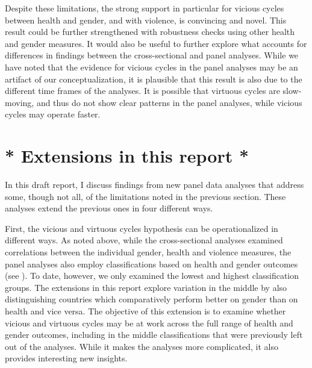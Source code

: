 \documentclass[12pt]{article}
\begin{document}
Despite these limitations, the strong support in particular for vicious cycles between health and gender, and with violence, is convincing and novel.
This result could be further strengthened with robustness checks using other health and gender measures.
It would also be useful to further explore what accounts for differences in findings between the cross-sectional and panel analyses.
While we have noted that the evidence for vicious cycles in the panel analyses may be an artifact of our conceptualization, it is plausible that this result is also due to the different time frames of the analyses. It is possible that virtuous cycles are slow-moving, and thus do not show clear patterns in the panel analyses, while vicious cycles may operate faster.

\section{* Extensions in this report *}
\label{extensions}

In this draft report, I discuss findings from new panel data analyses that address some, though not all, of the limitations noted in the previous section. These analyses extend the previous ones in four different ways.

First, the vicious and virtuous cycles hypothesis can be operationalized in different ways. As noted above, while the cross-sectional analyses examined correlations between the individual gender, health and violence measures, the panel analyses also employ classifications based on health and gender outcomes (see ). To date, however, we only examined the lowest and highest classification groups. The extensions in this report explore variation in the middle by also distinguishing countries which comparatively perform better on gender than on health and vice versa. The objective of this extension is to examine whether vicious and virtuous cycles may be at work across the full range of health and gender outcomes, including in the middle classifications that were previously left out of the analyses. While it makes the analyses more complicated, it also provides interesting new insights.
\end{document}
